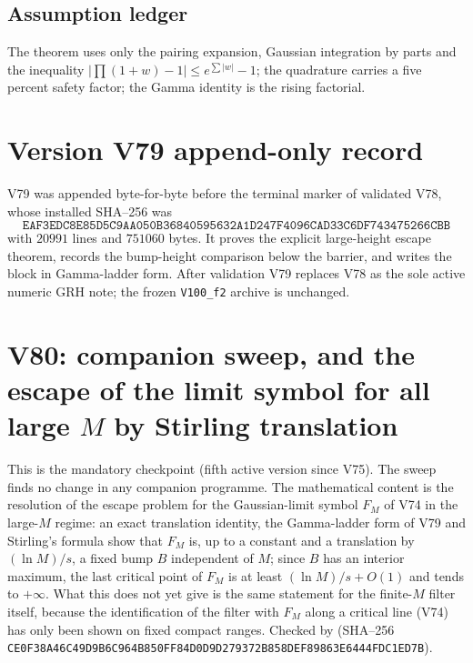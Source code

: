 \documentclass[11pt]{article}
\theoremstyle{definition}
\theoremstyle{remark}
\begin{document}
\subsection*{Assumption ledger}
\label{ass:f2v79}
The theorem uses only the pairing expansion, Gaussian integration by
parts and the inequality \(|\prod(1+w)-1|\le e^{\sum|w|}-1\); the
quadrature carries a five percent safety factor; the Gamma identity is
the rising factorial.
\endgroup

\section*{Version V79 append-only record}

V79 was appended byte-for-byte before the terminal marker of validated
V78, whose installed SHA--256 was
\[
 \texttt{EAF3EDC8E85D5C9AA050B36840595632}
 \allowbreak\texttt{A1D247F4096CAD33C6DF743475266CBB}
\]
with \(20991\) lines and \(751060\) bytes.  It proves the explicit
large-height escape theorem, records the bump-height comparison below
the barrier, and writes the block in Gamma-ladder form.  After
validation V79 replaces V78 as the sole active numeric GRH note; the
frozen \texttt{V100\_f2} archive is unchanged.





\clearpage
\section{V80: companion sweep, and the escape of the limit symbol for all large \texorpdfstring{$M$}{M} by Stirling translation}
\label{sec:f2v80-stirling}
\begingroup
\setcounter{equation}{0}
\renewcommand{\theequation}{N80.\arabic{equation}}
\renewcommand{\theHequation}{f2v80.\arabic{equation}}

This is the mandatory checkpoint (fifth active version since V75).  The
sweep finds no change in any companion programme.  The mathematical
content is the resolution of the escape problem for the Gaussian-limit
symbol \(F_M\) of V74 in the large-\(M\) regime: an exact translation
identity, the Gamma-ladder form of V79 and Stirling's formula show that
\(F_M\) is, up to a constant and a translation by \((\ln M)/s\), a fixed
bump \(B\) independent of \(M\); since \(B\) has an interior maximum, the
last critical point of \(F_M\) is at least \((\ln M)/s+O(1)\) and tends
to \(+\infty\).  What this does not yet give is the same statement for
the finite-\(M\) filter itself, because the identification of the filter
with \(F_M\) along a critical line (V74) has only been shown on fixed
compact ranges.  Checked by
 (SHA--256
\texttt{CE0F38A46C49D9B6C964B850FF84D0D9}\allowbreak\texttt{D279372B858DEF89863E6444FDC1ED7B}).
\end{document}
